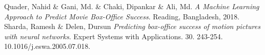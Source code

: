 \documentclass[10pt,twocolumn,letterpaper]{article}
\begin{document}

\begin{thebibliography}{9}
	Quader, Nahid \& Gani, Md. \& Chaki, Dipankar \& Ali, Md. 
	\textit{A Machine Learning Approach to Predict Movie Box-Office Success}. 
	Reading, Bangladesh, 2018.
	Sharda, Ramesh \& Delen, Dursun 
	\textit{Predicting box-office success of motion pictures with neural networks}. 
	Expert Systems with Applications. 30. 243-254. 10.1016/j.eswa.2005.07.018.
\end{thebibliography}
\end{document}
